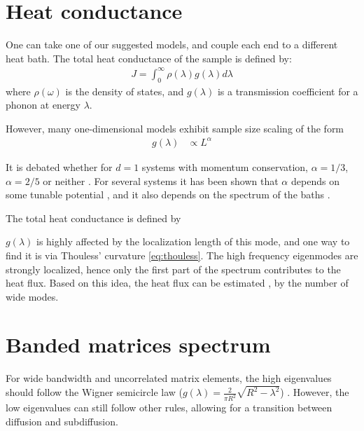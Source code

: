 \section{Heat conductance}

One can take one of our suggested models, and couple each end to a different heat bath.
The total heat conductance of the sample is defined by:
\begin{align}
J = \int_0^\infty \rho(\lambda) g(\lambda) d\lambda
\end{align}
where $\rho(\omega)$ is the density of states, and $g(\lambda)$ is 
a transmission coefficient for a phonon at energy $\lambda$.

 
However, many one-dimensional models 
\cite{narayan_anomalous_2002,dhar_heat_2001,lepri_anomalous_1998,savin_heat_2002} 
exhibit sample size scaling of the form
%
\begin{align}
g(\lambda)    &\propto L^\alpha
\end{align}

It is debated whether for $d=1$ systems
with momentum conservation,  $\alpha=1/3$,$\alpha=2/5$ or neither
\cite{narayan_anomalous_2002,delfini_comment_2008,dhar_dhar_2008,wang_power-law_2011}.
For several systems it has been shown that $\alpha$ depends on some tunable potential \cite{tong_wave_1999},
and it also depends on the spectrum of the baths \cite{dhar_heat_2001}.



The total heat conductance is defined by
%

$g(\lambda)$ is highly affected by the localization length of this mode, 
and one way to find it is via Thouless' curvature \autoref{eq:thouless}.
The high frequency eigenmodes are strongly localized, hence only the
first part of the spectrum contributes to the heat flux. Based on this idea,
the heat flux can be estimated \cite{lepri_thermal_2001,bodyfelt_unpub},
by the number of wide modes.





 


\section{Banded matrices spectrum}


For wide bandwidth and uncorrelated matrix elements, the high eigenvalues
should follow the Wigner semicircle law ($g(\lambda) = \frac{2}{\pi R^2}\sqrt{R^2-\lambda^2}$)
\cite{erdos_local_2012,fyodorov_scaling_1991,wigner_characteristic_1955}. However,
the low eigenvalues can still follow other rules, allowing for a transition
between diffusion and subdiffusion.






